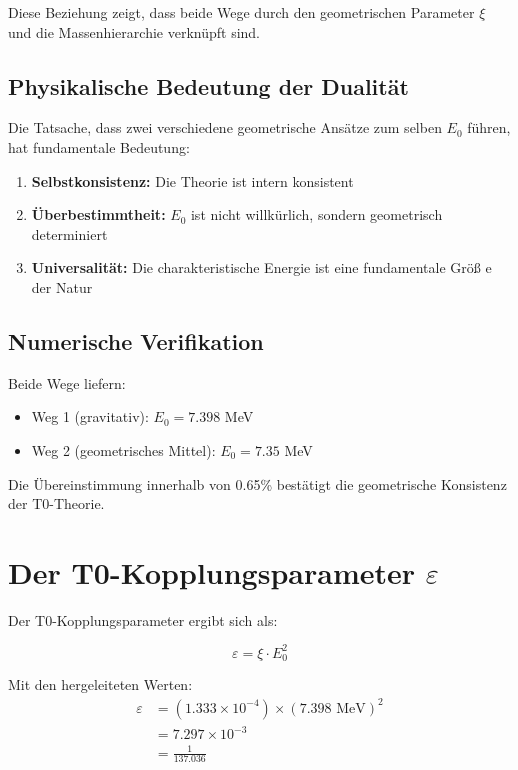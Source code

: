	Diese Beziehung zeigt, dass beide Wege durch den geometrischen Parameter $\xi$ und die Massenhierarchie verknüpft sind.
	
	\subsection{Physikalische Bedeutung der Dualität}
	
	Die Tatsache, dass zwei verschiedene geometrische Ansätze zum selben $E_0$ führen, hat fundamentale Bedeutung:
	
	\begin{enumerate}
		\item \textbf{Selbstkonsistenz:} Die Theorie ist intern konsistent
		\item \textbf{Überbestimmtheit:} $E_0$ ist nicht willkürlich, sondern geometrisch determiniert
		\item \textbf{Universalität:} Die charakteristische Energie ist eine fundamentale Größ e der Natur
	\end{enumerate}
	
	\subsection{Numerische Verifikation}
	
	Beide Wege liefern:
	\begin{itemize}
		\item Weg 1 (gravitativ): $E_0 = 7.398$ MeV
		\item Weg 2 (geometrisches Mittel): $E_0 = 7.35$ MeV
	\end{itemize}
	
	Die Übereinstimmung innerhalb von 0.65\% bestätigt die geometrische Konsistenz der T0-Theorie.
	
	\section{Der T0-Kopplungsparameter $\varepsilon$}
	
	Der T0-Kopplungsparameter ergibt sich als:
	
	\begin{equation}
		\varepsilon = \xi \cdot E_0^2
	\end{equation}
	
	Mit den hergeleiteten Werten:
	\begin{align}
		\varepsilon &= (1.333 \times 10^{-4}) \times (7.398 \text{ MeV})^2\\
		&= 7.297 \times 10^{-3}\\
		&= \frac{1}{137.036}
	\end{align}
	
